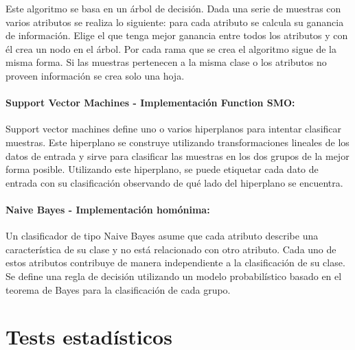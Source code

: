 
Este algoritmo se basa en un árbol de decisión. Dada una serie de muestras con varios atributos se realiza lo siguiente: para cada atributo se calcula su ganancia de información. Elige el que tenga mejor ganancia entre todos los atributos y con él crea un nodo en el árbol. Por cada rama que se crea el algoritmo sigue de la misma forma. Si las muestras pertenecen a la misma clase o los atributos no proveen información se crea solo una hoja.

\paragraph{Support Vector Machines \cite{Platt98sequentialminimal} - Implementación Function SMO:}


Support vector machines define uno o varios hiperplanos para intentar clasificar muestras. Este hiperplano se construye utilizando transformaciones lineales de los datos de entrada y sirve para clasificar las muestras en los dos grupos de la mejor forma posible. Utilizando este hiperplano, se puede etiquetar cada dato de entrada con su clasificación observando de qué lado del hiperplano se encuentra.

\paragraph{Naive Bayes \cite{DBLP:conf/flairs/Zhang04} - Implementación homónima:}


Un clasificador de tipo Naive Bayes asume que cada atributo describe una característica de su clase y no está relacionado con otro atributo. Cada uno de estos atributos contribuye de manera independiente a la clasificación de su clase. Se define una regla de decisión utilizando un modelo probabilístico basado en el teorema de Bayes para la clasificación de cada grupo.

\section{Tests estadísticos}

